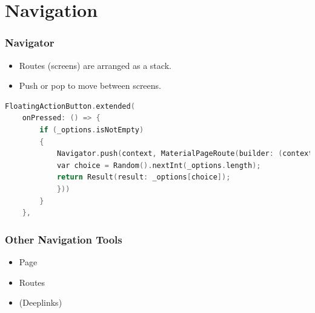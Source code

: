 \documentclass[compress, aspectratio=32]{beamer}
\begin{document}
\section{Navigation}
\begin{frame}[fragile]
    \frametitle{Navigator}
    \begin{itemize}
        \item Routes (screens) are arranged as a stack.
        \item Push or pop to move between screens.
    \end{itemize}
    \begin{lstlisting}[language=c, firstnumber=80]
FloatingActionButton.extended(
    onPressed: () => {
        if (_options.isNotEmpty)
        {
            Navigator.push(context, MaterialPageRoute(builder: (context) {
            var choice = Random().nextInt(_options.length);
            return Result(result: _options[choice]);
            }))
        }
    },
    \end{lstlisting}
\end{frame}

\begin{frame}
\frametitle{Other Navigation Tools}
\begin{itemize}
    \item Page
    \item Routes
    \item (Deeplinks)
\end{itemize}
\end{frame}
\end{document}
